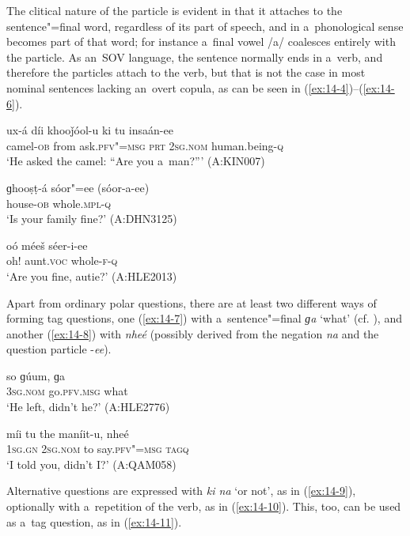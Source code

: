 The clitical nature of the particle is evident in that it attaches to the sentence"=final word, regardless of its part of speech, and in a~phonological sense becomes part of that word; for instance a~final vowel /a/ coalesces entirely with the particle. As an~SOV language, the sentence normally ends in a~verb, and therefore the particles attach to the verb, but that is not the case in most nominal sentences lacking an~overt copula, as can be seen in (\ref{ex:14-4})--(\ref{ex:14-6}).

\begin{exe}
\ex
\label{ex:14-4}
\gll ux-á díi khooǰóol-u ki tu insaán-ee \\
camel-\textsc{ob} from ask.\textsc{pfv"=msg} \textsc{prt} \textsc{2sg.nom} human.being-\textsc{q} \\
\glt `He asked the camel: ``Are you a~man?''' (A:KIN007)

\ex
\label{ex:14-5}
\gll ɡhooṣṭ-á sóor"=ee (sóor-a-ee) \\
house-\textsc{ob} whole.\textsc{mpl-q} \\
\glt `Is your family fine?' (A:DHN3125)

\ex
\label{ex:14-6}
\gll oó méeš séer-i-ee \\
oh! aunt.\textsc{voc} whole-\textsc{f-q} \\
\glt `Are you fine, autie?' (A:HLE2013)
\end{exe}

Apart from ordinary polar questions, there are at least two different ways of forming tag questions, one (\ref{ex:14-7}) with a~sentence"=final \textit{ɡa} `what' (cf. ), and another (\ref{ex:14-8}) with \textit{nheé} (possibly derived from the negation \textit{na} and the question particle -\textit{ee}).

\begin{exe}
\ex
\label{ex:14-7}
\gll so ɡúum, ɡa \\
\textsc{3sg.nom} go.\textsc{pfv.msg} what \\
\glt `He left, didn't he?' (A:HLE2776)

\ex
\label{ex:14-8}
\gll míi tu the maníit-u, nheé \\
\textsc{1sg.gn} \textsc{2sg.nom} to say.\textsc{pfv"=msg} \textsc{tagq} \\
\glt `I told you, didn't I?' (A:QAM058)
\end{exe}

Alternative questions are expressed with \textit{ki na} `or not', as in (\ref{ex:14-9}), optionally with a~repetition of the verb, as in (\ref{ex:14-10}). This, too, can be used as a~tag question, as in (\ref{ex:14-11}).

